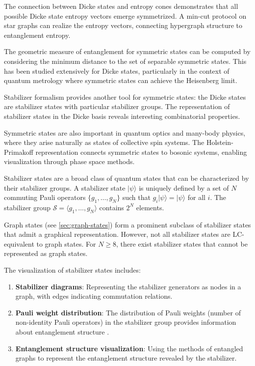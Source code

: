 \documentclass[12pt,a4paper]{article}
\begin{document}
The connection between Dicke states and entropy cones demonstrates that all possible Dicke state entropy vectors emerge symmetrized. A min-cut protocol on star graphs can realize the entropy vectors, connecting hypergraph structure to entanglement entropy.

The geometric measure of entanglement for symmetric states can be computed by considering the minimum distance to the set of separable symmetric states. This has been studied extensively for Dicke states, particularly in the context of quantum metrology where symmetric states can achieve the Heisenberg limit.

Stabilizer formalism provides another tool for symmetric states: the Dicke states are stabilizer states with particular stabilizer groups. The representation of stabilizer states in the Dicke basis reveals interesting combinatorial properties.

Symmetric states are also important in quantum optics and many-body physics, where they arise naturally as states of collective spin systems. The Holstein-Primakoff representation connects symmetric states to bosonic systems, enabling visualization through phase space methods.

Stabilizer states are a broad class of quantum states that can be characterized by their stabilizer groups. A stabilizer state $|\psi\rangle$ is uniquely defined by a set of $N$ commuting Pauli operators $\{g_1, \ldots, g_N\}$ such that $g_i |\psi\rangle = |\psi\rangle$ for all $i$. The stabilizer group $\mathcal{S} = \langle g_1, \ldots, g_N \rangle$ contains $2^N$ elements.

Graph states (see \cref{sec:graph-states}) form a prominent subclass of stabilizer states that admit a graphical representation. However, not all stabilizer states are LC-equivalent to graph states. For $N \geq 8$, there exist stabilizer states that cannot be represented as graph states.

The visualization of stabilizer states includes:
\begin{enumerate}
	\item \textbf{Stabilizer diagrams}: Representing the stabilizer generators as nodes in a graph, with edges indicating commutation relations.
	\item \textbf{Pauli weight distribution}: The distribution of Pauli weights (number of non-identity Pauli operators) in the stabilizer group provides information about entanglement structure \cite{GraphStateVis}.
	\item \textbf{Entanglement structure visualization}: Using the methods of entangled graphs to represent the entanglement structure revealed by the stabilizer.
\end{enumerate}
\end{document}
